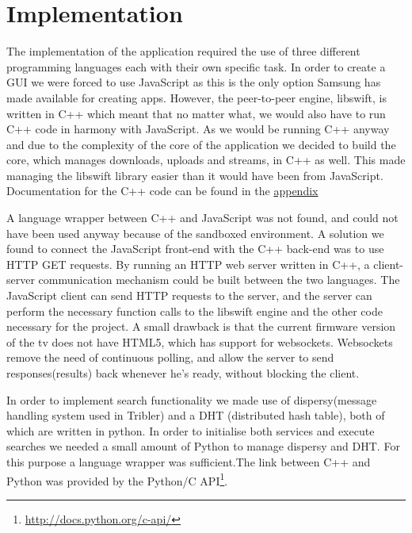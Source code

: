 \chapter{Implementation}

The implementation of the application required the use of three different programming languages each with their own specific task. In order to create a GUI we were forced to use JavaScript as this is the only option Samsung has made available for creating apps. However, the peer-to-peer engine, libswift, is written in C++ which meant that no matter what, we would also have to run C++ code in harmony with JavaScript. As we would be running C++ anyway and due to the complexity of the core of the application we decided to build the core, which manages downloads, uploads and streams, in C++ as well. This made managing the libswift library easier than it would have been from JavaScript. Documentation for the C++ code can be found in the \hyperref[sec:Doxygen]{appendix}

A language wrapper between C++ and JavaScript was not found, and could not have been used anyway because of the sandboxed environment. A solution we found to connect the JavaScript front-end with the C++ back-end was to use HTTP GET requests. By running an HTTP web server written in C++, a client-server communication mechanism could be built between the two languages. The JavaScript client can send HTTP requests to the server, and the server can perform the necessary function calls to the libswift engine and the other code necessary for the project. A small drawback is that the current firmware version of the tv does not have HTML5, which has support for websockets. Websockets remove the need of continuous polling, and allow the server to send responses(results) back whenever he's ready, without blocking the client. 

In order to implement search functionality we made use of dispersy(message handling system used in Tribler) and a DHT (distributed hash table), both of which are written in python. In order to initialise both services and execute searches we needed a small amount of Python to manage dispersy and DHT. For this purpose a language wrapper was sufficient.The link between C++ and Python was provided by the Python/C API\footnote{\url{http://docs.python.org/c-api/}}.

